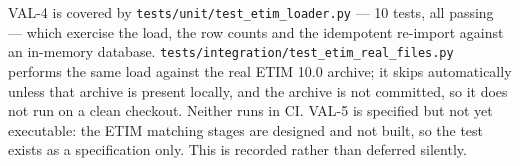 \documentclass[12pt, a4paper]{article}
\begin{document}
\vspace{0.5cm}
\noindent VAL-4 is covered by \texttt{tests/unit/test\_etim\_loader.py} --- 10 tests, all passing --- which exercise the load, the row counts and the idempotent re-import against an in-memory database. \texttt{tests/integration/test\_etim\_real\_files.py} performs the same load against the real ETIM 10.0 archive; it skips automatically unless that archive is present locally, and the archive is not committed, so it does not run on a clean checkout. Neither runs in CI. VAL-5 is specified but not yet executable: the ETIM matching stages are designed and not built, so the test exists as a specification only. This is recorded rather than deferred silently.
\end{document}
